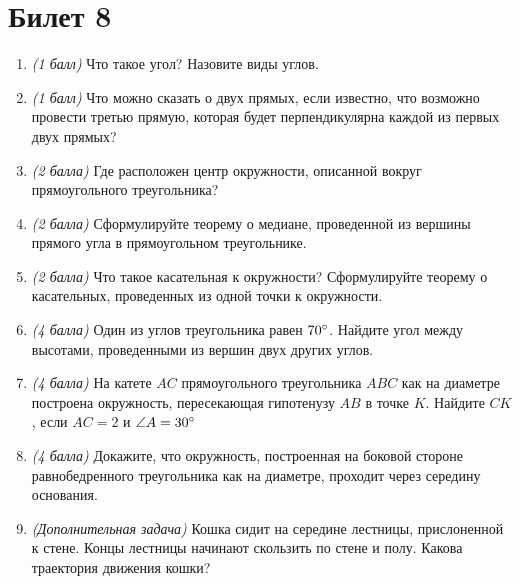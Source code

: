 \documentclass[12pt, a4paper]{article}
\begin{document}
\section*{Билет 8}
\begin{enumerate}
\item \textit{(1 балл)} Что такое угол? Назовите виды углов.
\item \textit{(1 балл)} Что можно сказать о двух прямых, если известно, что возможно провести третью прямую, которая будет перпендикулярна каждой из первых двух прямых?
\item \textit{(2 балла)} Где расположен центр окружности, описанной вокруг прямоугольного треугольника?
\item \textit{(2 балла)} Сформулируйте теорему о медиане, проведенной из вершины прямого угла в прямоугольном треугольнике.
\item \textit{(2 балла)} Что такое касательная к окружности? Сформулируйте теорему о касательных, проведенных из одной точки к окружности.
\item \textit{(4 балла)} Один из углов треугольника равен $70\degree$. Найдите угол между высотами, проведенными из вершин двух других углов.
\item \textit{(4 балла)} На катете $AC$ прямоугольного треугольника $ABC$ как на диаметре построена окружность, пересекающая гипотенузу $AB$ в точке $K$. Найдите $CK$, если $AC = 2$ и $\angle A = 30\degree$
\item \textit{(4 балла)} Докажите, что окружность, построенная на боковой стороне равнобедренного треугольника как на диаметре, проходит через середину основания.
\item \textit{(Дополнительная задача)} Кошка сидит на середине лестницы, прислоненной к стене. Концы лестницы начинают скользить по стене и полу. Какова траектория движения кошки?
\end{enumerate}
\end{document}
